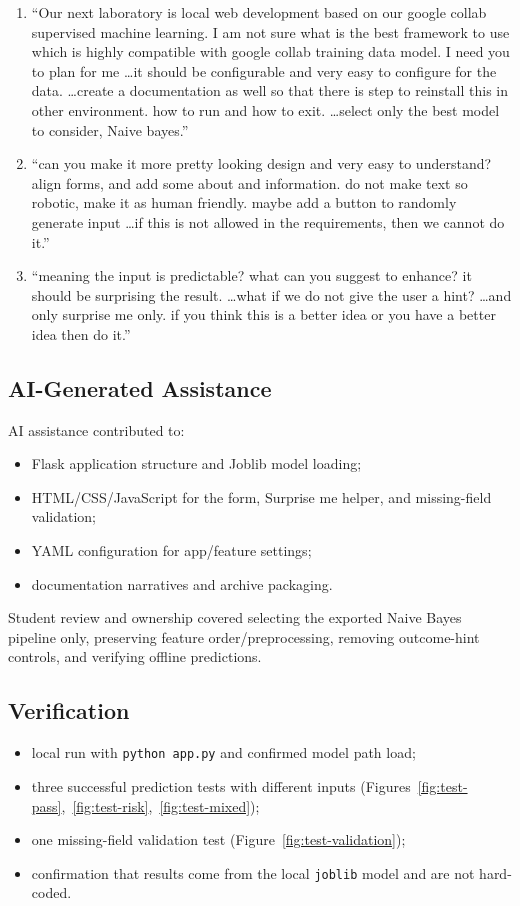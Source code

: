 \documentclass[11pt,a4paper]{article}
\begin{document}
\begin{enumerate}[leftmargin=*]
  \item ``Our next laboratory is local web development based on our google collab supervised machine learning. I am not sure what is the best framework to use which is highly compatible with google collab training data model. I need you to plan for me \ldots it should be configurable and very easy to configure for the data. \ldots create a documentation as well so that there is step to reinstall this in other environment. how to run and how to exit. \ldots select only the best model to consider, Naive bayes.''
  \item ``can you make it more pretty looking design and very easy to understand? align forms, and add some about and information. do not make text so robotic, make it as human friendly. maybe add a button to randomly generate input \ldots if this is not allowed in the requirements, then we cannot do it.''
  \item ``meaning the input is predictable? what can you suggest to enhance? it should be surprising the result. \ldots what if we do not give the user a hint? \ldots and only surprise me only. if you think this is a better idea or you have a better idea then do it.''
\end{enumerate}

\subsection*{AI-Generated Assistance}
AI assistance contributed to:
\begin{itemize}[leftmargin=*]
  \item Flask application structure and Joblib model loading;
  \item HTML/CSS/JavaScript for the form, Surprise me helper, and missing-field validation;
  \item YAML configuration for app/feature settings;
  \item documentation narratives and archive packaging.
\end{itemize}

Student review and ownership covered selecting the exported Naive Bayes pipeline only, preserving feature order/preprocessing, removing outcome-hint controls, and verifying offline predictions.

\subsection*{Verification}
\begin{itemize}[leftmargin=*]
  \item local run with \texttt{python app.py} and confirmed model path load;
  \item three successful prediction tests with different inputs (Figures~\ref{fig:test-pass},~\ref{fig:test-risk},~\ref{fig:test-mixed});
  \item one missing-field validation test (Figure~\ref{fig:test-validation});
  \item confirmation that results come from the local \texttt{joblib} model and are not hard-coded.
\end{itemize}
\end{document}
